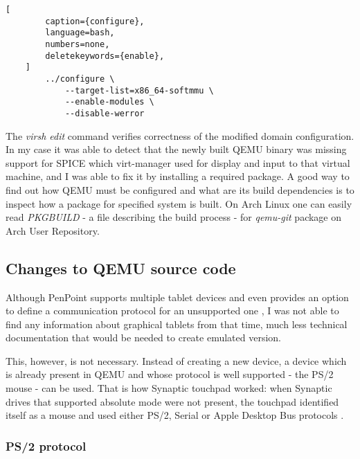 \begin{codeblock}
    \begin{lstlisting}[
        caption={configure},
        language=bash,
        numbers=none,
        deletekeywords={enable},
    ]
        ../configure \
            --target-list=x86_64-softmmu \
            --enable-modules \
            --disable-werror
    \end{lstlisting}
\end{codeblock}

The \emph{virsh edit} command verifies correctness of the modified domain
configuration.  In my case it was able to detect that the newly built QEMU
binary was missing support for SPICE which virt-manager used for display and
input to that virtual machine, and I was able to fix it by installing a required
package.  A good way to find out how QEMU must be configured and what are its
build dependencies is to inspect how a package for specified system is built.
On Arch Linux one can easily read \emph{PKGBUILD} - a file describing the build
process - for \emph{qemu-git} package on Arch User Repository.

\subsection{Changes to QEMU source code}


Although PenPoint supports multiple tablet devices and even provides an option
to define a communication protocol for an unsupported one \cite{godevtools}, I was
not able to find any information about graphical tablets from that time, much
less technical documentation that would be needed to create emulated version.

This, however, is not necessary.  Instead of creating a new device, a device
which is already present in QEMU and whose protocol is well supported - the PS/2
mouse - can be used.  That is how Synaptic touchpad worked: when Synaptic drives
that supported absolute mode were not present, the touchpad identified itself as
a mouse and used either PS/2, Serial or Apple Desktop Bus protocols
\cite{synapticsinterfacing}.

\subsubsection{PS/2 protocol}

